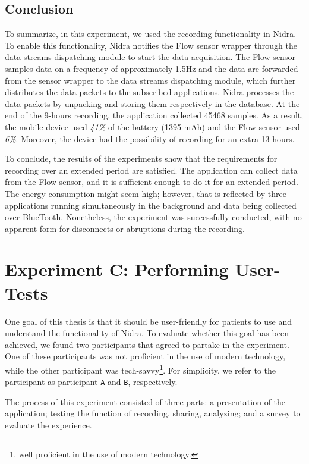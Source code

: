 \subsection{Conclusion}
To summarize, in this experiment, we used the recording functionality in Nidra. To enable this functionality, Nidra notifies the Flow sensor wrapper through the data streams dispatching module to start the data acquisition. The Flow sensor samples data on a frequency of approximately 1.5Hz and the data are forwarded from the sensor wrapper to the data streams dispatching module, which further distributes the data packets to the subscribed applications. Nidra processes the data packets by unpacking and storing them respectively in the database. At the end of the 9-hours recording, the application collected 45468 samples. As a result, the mobile device used \textit{41\%} of the battery (1395 mAh) and the Flow sensor used \textit{6\%}. Moreover, the device had the possibility of recording for an extra 13 hours.

To conclude, the results of the experiments show that the requirements for recording over an extended period are satisfied. The application can collect data from the Flow sensor, and it is sufficient enough to do it for an extended period. The energy consumption might seem high; however, that is reflected by three applications running simultaneously in the background and data being collected over BlueTooth. Nonetheless, the experiment was successfully conducted, with no apparent form for disconnects or abruptions during the recording. 

\section{Experiment C: Performing User-Tests}
One goal of this thesis is that it should be user-friendly for patients to use and understand the functionality of Nidra. To evaluate whether this goal has been achieved, we found two participants that agreed to partake in the experiment. One of these participants was not proficient in the use of modern technology, while the other participant was tech-savvy\footnote{well proficient in the use of modern technology.}. For simplicity, we refer to the participant as participant \verb|A| and \verb|B|, respectively. 

The process of this experiment consisted of three parts: a presentation of the application; testing the function of recording, sharing, analyzing; and a survey to evaluate the experience. 

